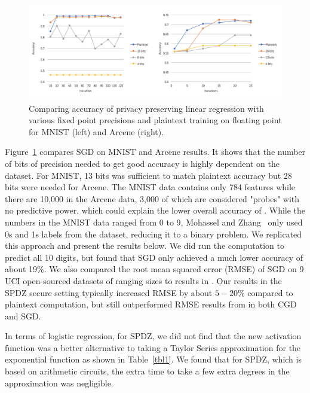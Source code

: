 \documentclass{article}
\begin{document}
\begin{figure}[h!]
\vspace{-4mm}
\centering
  \includegraphics[scale=0.6]{mnistarcene.png}
  \vspace{-4mm}
   \caption{Comparing accuracy of privacy preserving linear regression with various fixed point precisions and plaintext training on floating point for MNIST (left) and Arcene (right).}
   \label{fig:result2}  
\end{figure}

Figure~\ref{fig:result2} compares SGD on MNIST and Arcene results. It shows that the number of bits of precision needed to get good accuracy is highly dependent on the dataset. For MNIST, 13 bits was sufficient to match plaintext accuracy but 28 bits were needed for Arcene. The MNIST data contains only 784 features while there are 10,000 in the Arcene data, 3,000 of which are considered "probes" with no predictive power, which could explain the lower overall accuracy of \cite{MZ17}. While the numbers in the MNIST data ranged from 0 to 9, Mohassel and Zhang~\cite{MZ17} only used 0s and 1s labels from the dataset, reducing it to a binary problem. We replicated this approach and present the results below. We did run the computation to predict all 10 digits, but found that SGD only achieved a much lower accuracy of about 19\%. We also compared the root mean squared error (RMSE) of SGD on 9 UCI open-sourced datasets of ranging sizes to results in \cite{GSB0DZE17}. Our results in the SPDZ secure setting typically increased RMSE by about $5-20\%$ compared to plaintext computation, but still outperformed RMSE results from \cite{GSB0DZE17} in both CGD and SGD.

In terms of logistic regression, for SPDZ, we did not find that the new activation function was a better alternative to taking a Taylor Series approximation for the exponential function as shown in Table~\ref{tbl1}. We found that for SPDZ, which is based on arithmetic circuits, the extra time to take a few extra degrees in the approximation was negligible.  
\end{document}
